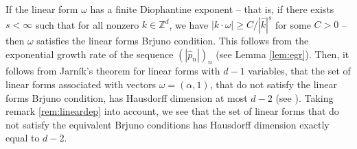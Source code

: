 \documentclass[12pt,reqno,a4paper]{amsart}%
\numberwithin{equation}{section}
\newcommand{\Zz}{{\mathbb{Z}}}
\begin{document}
\begin{remark}\label{remark 311}
	If the linear form $\omega$ has a finite Diophantine exponent -- that is, if there exists $s<\infty$ such that for all nonzero $k\in\Zz^d$, we have $|k\cdot\omega|\geq C/|\hat k|^s$ for some $C>0$ -- then $\omega$ satisfies the linear forms Brjuno condition. This follows from the exponential growth rate of the sequence  $(|\hat p_n|)_n$ (see Lemma \ref{lem:egr}). 
 Then, it follows from  Jarn\'ik's theorem for linear forms with $d-1$ variables, that the set of linear forms associated with vectors $\omega=(\alpha,1)$, that do not satisfy the linear forms Brjuno condition, has   Hausdorff dimension at most $d-2$ (see \cite{BoveyDodson1986}).  Taking remark \ref{rem:lineardep} into account, we see that the set of linear forms that do not satisfy the  equivalent  Brjuno conditions has   Hausdorff dimension exactly equal to $d-2$.
\end{remark}
\end{document}
